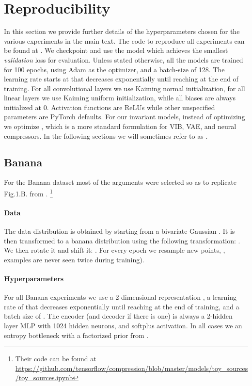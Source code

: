 \documentclass[final]{article}
\begin{document}
\clearpage
\newpage 
\section{Reproducibility}
\label{appx:reproducability}
In this section we provide further details of the hyperparameters chosen for the various experiments in the main text.
The code to reproduce all experiments can be found at \codeurl{}.
We checkpoint and use the model which achieves the smallest \textit{validation} loss for evaluation.
Unless stated otherwise, all the models are trained for 100 epochs, using Adam \cite{kingma_adam_2015} as the optimizer, and a batch-size of 128. 
The learning rate starts at  that decreases exponentially until reaching  at the end of training.
For all convolutional layers we use Kaiming normal initialization\cite{he_delving_2015}, for all linear layers we use Kaiming uniform initialization\cite{he_delving_2015},  while all biases are always initialized at 0.
Activation functions are ReLUs while other unspecified parameters are PyTorch \cite{paszke_pytorch_2019} defaults.
For our invariant models, instead of optimizing  we optimize , which is a more standard formulation for VIB, VAE, and neural compressors.
In the following sections we will sometimes refer to  as .

\subsection{Banana}
\label{appx:reproducability_banana}

For the Banana dataset most of the arguments were selected so as to replicate Fig.1.B. from \cite{balle_nonlinear_2020}. 
\footnote{Their code can be found at \url{https://github.com/tensorflow/compression/blob/master/models/toy_sources/toy_sources.ipynb}} 

\paragraph{Data}
The data distribution is obtained by starting from a bivariate Gaussian .
It is then transformed to a banana distribution using the following transformation: .
We then rotate it and shift it: .
For every epoch we resample  new points, \ie, examples are never seen twice during training).

\paragraph{Hyperparameters}
For all Banana experiments we use a 2 dimensional representation , a learning rate of  that decreases exponentially until reaching  at the end of training, and a batch size of .
The encoder (and decoder if there is one) is always a 2-hidden layer MLP with 1024 hidden neurons, and softplus activation.
In all cases we an entropy bottleneck with a factorized prior from \cite{balle_variational_2018}.
\end{document}
